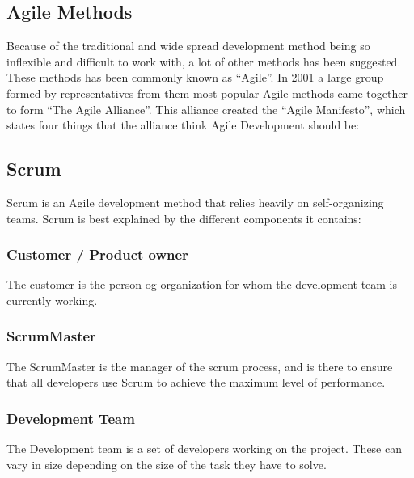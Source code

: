 \subsection{Agile Methods}
Because of the traditional and wide spread development method being so inflexible and difficult to work with, a lot of other methods has been suggested.
These methods has been commonly known as ``Agile''.
In 2001 a large group formed by representatives from them most popular Agile methods came together to form ``The Agile Alliance''.
This alliance created the ``Agile Manifesto'', which states four things that the alliance think Agile Development should be:


\subsection{Scrum}
Scrum is an Agile development method that relies heavily on self-organizing teams. Scrum is best explained by the different components it contains:

\subsubsection{Customer / Product owner}
The customer is the person og organization for whom the development team is currently working.

\subsubsection{ScrumMaster}
The ScrumMaster is the manager of the scrum process, and is there to ensure that all developers use Scrum to achieve the maximum level of performance.

\subsubsection{Development Team}
The Development team is a set of developers working on the project. These can vary in size depending on the size of the task they have to solve.

